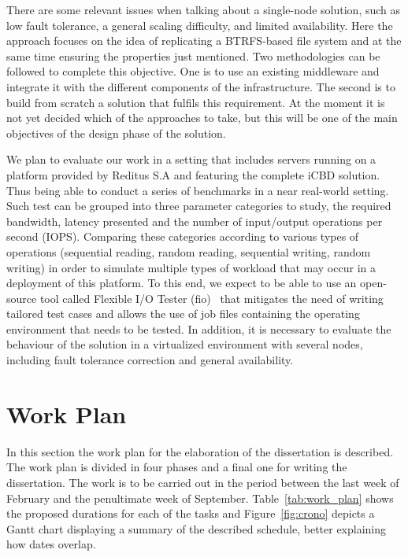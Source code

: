 There are some relevant issues when talking about a single-node solution, such as low fault tolerance, a general scaling difficulty, and limited availability. Here the approach focuses on the idea of replicating a BTRFS-based file system and at the same time ensuring the properties just mentioned.
Two methodologies can be followed to complete this objective. One is to use an existing middleware and integrate it with the different components of the infrastructure. The second is to build from scratch a solution that fulfils this requirement. At the moment it is not yet decided which of the approaches to take, but this will be one of the main objectives of the design phase of the solution.

We plan to evaluate our work in a setting that includes servers running on a platform provided by Reditus S.A and featuring the complete iCBD solution. Thus being able to conduct a series of benchmarks in a near real-world setting. Such test can be grouped into three parameter categories to study, the required bandwidth, latency presented and the number of input/output operations per second (IOPS). Comparing these categories according to various types of operations (sequential reading, random reading, sequential writing, random writing) in order to simulate multiple types of workload that may occur in a deployment of this platform. 
To this end, we expect to be able to use an open-source tool called  Flexible I/O Tester (fio)~\cite{github_fio} that mitigates the need of writing tailored test cases and allows the use of job files containing the operating environment that needs to be tested.
In addition, it is necessary to evaluate the behaviour of the solution in a virtualized environment with several nodes, including fault tolerance correction and general availability.




\section{Work Plan} %
\label{sec:work_plan}

In this section the work plan for the elaboration of the dissertation is described. The work plan is divided in four phases and a final one for writing the dissertation.
The work is to be carried out in the period between the last week of February and the penultimate week of September. Table~\ref{tab:work_plan} shows the proposed durations for each of the tasks and Figure~\ref{fig:crono} depicts a Gantt chart displaying a summary of the described schedule, better explaining how dates overlap.

